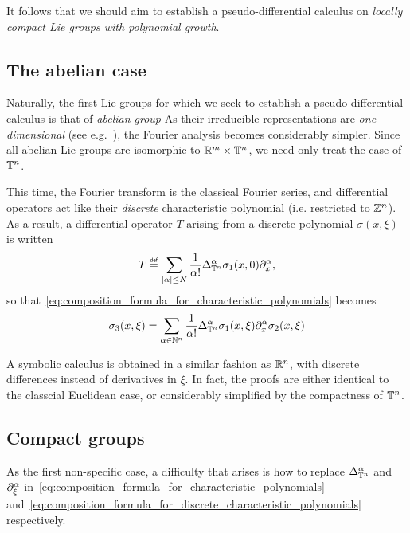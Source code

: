 It follows that we should aim to establish a pseudo-differential calculus on \emph{locally compact Lie groups with polynomial growth}.

\subsection{The abelian case}

Naturally, the first Lie groups for which we seek to establish a pseudo-differential calculus is that of \emph{abelian group}
As their irreducible representations are \emph{one-dimensional} (see e.g.~\cite[Corollary 6.3.26]{RuzhanskyTurunen10}),
the Fourier analysis becomes considerably simpler.
Since all abelian Lie groups are isomorphic to $\R^m \times \T^n$,
we need only treat the case of $\T^n$.

This time,
the Fourier transform is the classical Fourier series,
and differential operators act like their \emph{discrete} characteristic polynomial (i.e. restricted to $\Z^n$).
As a result,
a differential operator $T$ arising from a discrete polynomial $\sigma(x, \xi)$ is written
\begin{align*}
    T \defeq \sum_{\abs \alpha \leq N} \frac 1 {\alpha!} \DifferenceOperatorOrder [\T^n] \alpha \sigma_1(x, 0) \iD{x^\alpha},
\end{align*}
so that~\eqref{eq:composition_formula_for_characteristic_polynomials} becomes
\begin{align}
    \sigma_3(x, \xi) = \sum_{\alpha \in \N^n} \frac 1 {\alpha!} \DifferenceOperatorOrder [\T^n] \alpha \sigma_1(x, \xi) \iD{x^\alpha} \sigma_2(x, \xi)
    \label{eq:composition_formula_for_discrete_characteristic_polynomials}
\end{align}

A symbolic calculus is obtained in a similar fashion as $\R^n$,
with discrete differences instead of derivatives in $\xi$.
In fact, the proofs are either identical to the classcial Euclidean case,
or considerably simplified by the compactness of $\T^n$.

\subsection{Compact groups}

As the first non-specific case,
a difficulty that arises is how to replace $\DifferenceOperatorOrder [\T^n] \alpha$ and $\iD{\xi^\alpha}$
in~\eqref{eq:composition_formula_for_characteristic_polynomials} and~\eqref{eq:composition_formula_for_discrete_characteristic_polynomials} respectively.

